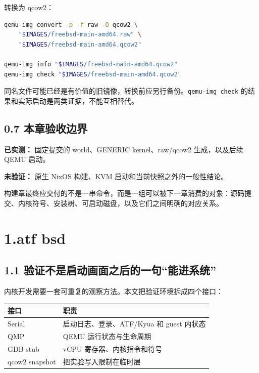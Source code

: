 \documentclass[
  11pt,
  UTF8,
  a4paper,
  fontset=fandol]{ctexart}
\newcommand{\passthrough}[1]{#1}
\begin{document}
转换为 qcow2：

\begin{lstlisting}[language=sh]
qemu-img convert -p -f raw -O qcow2 \
    "$IMAGES/freebsd-main-amd64.raw" \
    "$IMAGES/freebsd-main-amd64.qcow2"

qemu-img info "$IMAGES/freebsd-main-amd64.qcow2"
qemu-img check "$IMAGES/freebsd-main-amd64.qcow2"
\end{lstlisting}

同名文件可能已经是有价值的旧镜像，转换前应另行备份。\passthrough{\lstinline!qemu-img check!}
的结果和实际启动是两类证据，不能互相替代。

\subsection{0.7
本章验收边界}\label{ux672cux7ae0ux9a8cux6536ux8fb9ux754c}

\textbf{已实测：} 固定提交的 world、GENERIC kernel、raw/qcow2
生成，以及后续 QEMU 启动。

\textbf{未验证：} 原生 NixOS 构建、KVM 启动和当前快照之外的一般性结论。

构建章最终应交付的不是一串命令，而是一组可以被下一章消费的对象：源码提交、内核符号、安装树、可启动磁盘，以及它们之间明确的对应关系。

\section{1.atf bsd}\label{atf-bsd}

\subsection{1.1
验证不是启动画面之后的一句``能进系统''}\label{ux9a8cux8bc1ux4e0dux662fux542fux52a8ux753bux9762ux4e4bux540eux7684ux4e00ux53e5ux80fdux8fdbux7cfbux7edf}

内核开发需要一套可重复的观察方法。本文把验证环境拆成四个接口：

\begin{longtable}[]{@{}
  >{\raggedright\arraybackslash}p{}
  >{\raggedright\arraybackslash}p{}@{}}
\toprule\noalign{}
\begin{minipage}[b]{\linewidth}\raggedright
接口
\end{minipage} & \begin{minipage}[b]{\linewidth}\raggedright
职责
\end{minipage} \\
\midrule\noalign{}
\endhead
\bottomrule\noalign{}
\endlastfoot
Serial & 启动日志、登录、ATF/Kyua 和 guest 内状态 \\
QMP & QEMU 运行状态与生命周期 \\
GDB stub & vCPU 寄存器、内核指令和符号 \\
qcow2 snapshot & 把实验写入限制在临时层 \\
\end{longtable}
\end{document}
